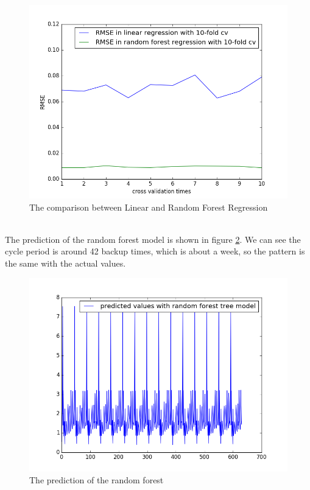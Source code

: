 \documentclass{article}
\begin{document}
\begin{figure}[htbp]
\centering
\includegraphics[width=.6\textwidth]{compare.png}
\caption{The comparison between Linear and Random Forest Regression}
\label{fig:comp}
\end{figure}
\\
The prediction of the random forest model is shown in figure \ref{fig:r_pred}. We can see the cycle period is around 42 backup times, which is about a week, so the pattern is the same with the actual values.
\begin{figure}[htbp]
\centering
\includegraphics[width=.6\textwidth]{random_pred.png}
\caption{The prediction of the random forest}
\label{fig:r_pred}
\end{figure}
\end{document}

